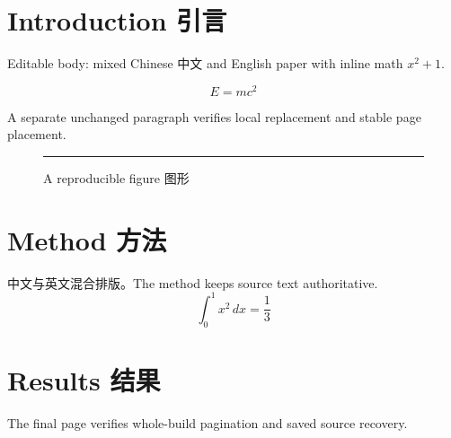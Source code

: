 \documentclass{ctexart}
\begin{document}
\section{Introduction 引言}
Editable body: mixed Chinese 中文 and English paper with inline math $x^2+1$.

\[ E = mc^2 \]

A separate unchanged paragraph verifies local replacement and stable page placement.
\begin{figure}[h]
\centering\rule{60mm}{12mm}
\caption{A reproducible figure 图形}
\end{figure}
\newpage
\section{Method 方法}
中文与英文混合排版。The method keeps source text authoritative.
\[ \int_0^1 x^2\,dx = \frac{1}{3} \]
\newpage
\section{Results 结果}
The final page verifies whole-build pagination and saved source recovery.
\end{document}

